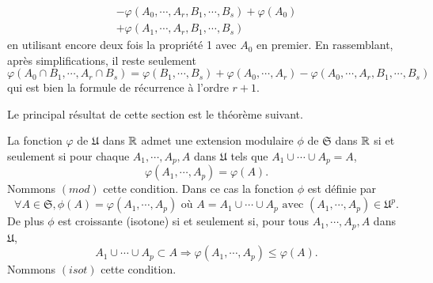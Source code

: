\begin{demo}
\begin{enumerate}
\begin{align*}
       - \varphi(A_0, \cdots, A_r,B_1, \cdots, B_s) + \varphi(A_0) \\
       + \varphi(A_1, \cdots, A_r,B_1, \cdots, B_s)
    \end{align*}
    en utilisant encore deux fois la propriété 1 avec $A_0$ en premier. En rassemblant, après simplifications, il reste seulement
    \begin{displaymath}
      \varphi(A_0\cap B_1, \cdots, A_r \cap B_s) 
      = \varphi( B_1, \cdots , B_s) + \varphi(A_0, \cdots, A_r) - \varphi(A_0, \cdots, A_r,B_1, \cdots, B_s)
    \end{displaymath}
    qui est bien la formule de récurrence à l'ordre $r+1$.
  \end{enumerate}
\end{demo}
Le principal résultat de cette section est le théorème suivant.
\begin{thm}
  La fonction $\varphi$ de $\mathfrak{U}$ dans $\mathbb{R}$ admet une extension modulaire $\phi$ de $\mathfrak{S}$ dans $\mathbb{R}$ si et seulement si pour chaque $A_1, \cdots,A_p,A$ dans $\mathfrak{U}$ tels que $A_1 \cup \cdots \cup A_p = A$, 
  \begin{displaymath}
    \varphi(A_1, \cdots,A_p) = \varphi(A).
  \end{displaymath}
  Nommons $(mod)$ cette condition. Dans ce cas la fonction $\phi$ est définie par
  \begin{displaymath}
    \forall A \in \mathfrak{S}, \phi(A) = \varphi(A_1,\cdots, A_p) \text{ où } A = A_1 \cup \cdots \cup A_p \text{ avec }(A_1,\cdots,A_p) \in \mathfrak{U}^p.
  \end{displaymath}
  De plus $\phi$ est croissante (isotone) si et seulement si, pour tous $A_1, \cdots, A_p, A$ dans $\mathfrak{U}$,
  \begin{displaymath}
    A_1 \cup \cdots \cup A_p \subset A \Rightarrow \varphi(A_1, \cdots, A_p) \leq \varphi(A).
  \end{displaymath}
  Nommons $(isot)$ cette condition.
\end{thm}
